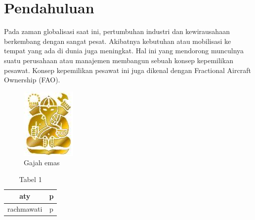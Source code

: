 \chapter{Pendahuluan}
Pada zaman globalisasi saat ini, pertumbuhan industri dan kewirausahaan berkembang dengan sangat pesat. Akibatnya kebutuhan atau mobilisasi ke tempat yang ada di dunia juga meningkat. Hal ini yang mendorong munculnya suatu perusahaan atau manajemen membangun sebuah konsep kepemilikan pesawat. Konsep kepemilikan pesawat ini juga dikenal dengan Fractional Aircraft Ownership  (FAO).
\begin{figure}
\begin{center}
\includegraphics{Gadjahemas}
\caption{Gajah emas}
\end{center}
\end{figure}

\begin{table}
\begin{center}
\caption{Tabel 1}

\begin{tabular}{|c|c|}
\hline aty & p \\ 
\hline rachmawati & p \\ 
\hline 
\end{tabular}
\end{center}
\end{table}

